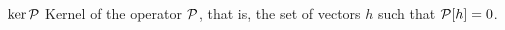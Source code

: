 \begin{simbolos}
    \item[$ \ker \mathcal{P} $] Kernel of the operator $ \mathcal{P} $, that is, the set of vectors $ h $ such that $ \mathcal{P} [ h ] = 0 $.
\end{simbolos}
